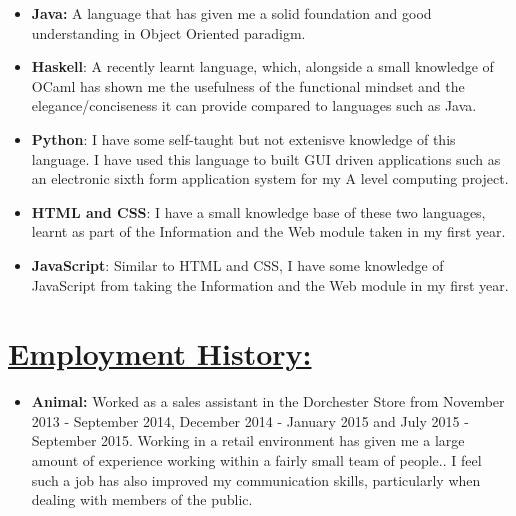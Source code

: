 \documentclass[11pt]{article}
\begin{document}
		\begin{itemize}
			\item \textbf{Java:} A language that has given me a solid foundation and good understanding in Object Oriented paradigm.
			\item \textbf{Haskell}: A recently learnt language, which, alongside a small knowledge of OCaml has shown me the usefulness of the functional mindset and the elegance/conciseness it can provide compared to languages such as Java.
			\item \textbf{Python}: I have some self-taught but not extenisve knowledge of this language. I have used this language to built GUI driven applications such as an electronic sixth form application system for my A level computing project.
			\item \textbf{HTML and CSS}: I have a small knowledge base of these two languages, learnt as part of the Information and the Web module taken in my first year.
			\item \textbf{JavaScript}: Similar to HTML and CSS, I have some knowledge of JavaScript from taking the Information and the Web module in my first year.
		\end{itemize} 

	\vspace{-5pt}
	\hspace{-100pt}\section*{\underline{Employment History:}}
		\begin{itemize}
			\item \textbf{Animal:} Worked as a sales assistant in the Dorchester Store from November 2013 - September 2014, December 2014 - January 2015 and July 2015 - September 2015. Working in a retail environment has given me a large amount of experience working within a fairly small team of people.. I feel such a job has also improved my communication skills, particularly when dealing with members of the public. 
		\end{itemize}
\end{document}
